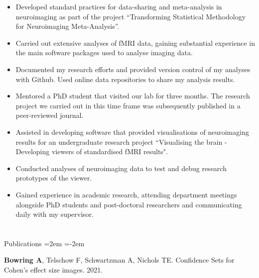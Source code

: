 \documentclass{my_cv}
\begin{document}
%
    {\begin{itemize}[topsep=0pt,itemsep=0pt,partopsep=0pt, parsep=0pt] 
    \item Developed standard practices for data-sharing and meta-analysis in neuroimaging as part of the project ``Transforming Statistical Methodology for Neuroimaging Meta-Analysis”. 
    \item Carried out extensive analyses of fMRI data, gaining substantial experience in the main software packages used to analyse imaging data.
    \item Documented my research efforts and provided version control of my analyses with Github. Used online data repositories to share my analysis results. 
    \item Mentored a PhD student that visited our lab for three months. The research project we carried out in this time frame was subsequently published in a peer-reviewed journal. 
    \end{itemize}
    }%
     
%
    {\uline{ \hfill {}}}%
    {\begin{itemize}[topsep=0pt,itemsep=0pt,partopsep=0pt, parsep=0pt] 
    \item Assisted in developing software that provided visualisations of neuroimaging results for an undergraduate research project ``Visualising the brain - Developing viewers of standardised fMRI results". 
    \item Conducted analyses of neuroimaging data to test and debug research prototypes of the viewer. 
    \item Gained experience in academic research, attending department meetings alongside PhD students and post-doctoral researchers and communicating daily with my supervisor.
    \end{itemize}
    }%
    
\section{\faBook}{Publications}
\leftskip=2em
\parindent=-2em

\hspace{-2em}\textbf{Bowring A}, Telschow F, Schwartzman A, Nichols TE. Confidence Sets for Cohen's  effect size images.  2021. 
\end{document}
